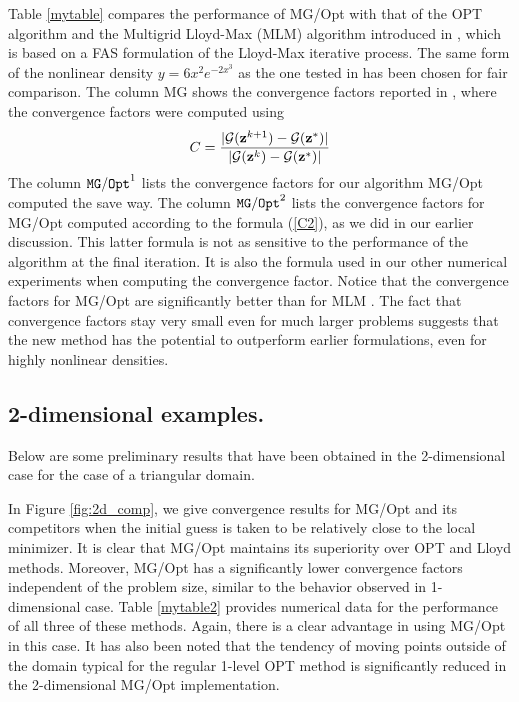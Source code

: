 \documentclass{siamltex}
\newcommand{\ds}{\displaystyle}
\begin{document}
Table  \ref{mytable} compares the performance of MG/Opt with that of the OPT algorithm and the Multigrid Lloyd-Max (MLM) algorithm  introduced in \cite{yavneh03}, which is based on a FAS formulation of the Lloyd-Max iterative process. The same form of the nonlinear density $y=6x^{2}e^{-2x^{3}}$ as the one tested in \cite{yavneh03} has been chosen for fair comparison.  The column MG\cite{yavneh03} shows the convergence factors reported in \cite{yavneh03}, where the convergence factors were computed using
\begin{equation}
\ds C=\frac{|\cg(\bz^{k+1})-\cg(\bz^{*})| }{|\cg(\bz^{k})-\cg(\bz^{*})| }
\label{C1}
\end{equation}
The column ${\tt MG/Opt}^{1}$ lists the convergence factors for our algorithm MG/Opt computed the save way. The column ${\tt MG/Opt}^{2}$ lists the convergence factors for MG/Opt computed according to the formula (\ref{C2}), as we did in our earlier discussion. This latter formula is not as sensitive to the performance of the algorithm at the final iteration. It is also the formula used in our other numerical experiments when computing the convergence factor. Notice that the convergence factors for MG/Opt are significantly better than for MLM \cite{yavneh03}. The fact that convergence factors stay very small even for much larger problems  suggests that the new method has the potential to outperform earlier formulations, %
even for highly nonlinear densities.

\subsection{2-dimensional examples.}
Below are some preliminary results that have been obtained in the 2-dimensional %
case for the case of a triangular domain. %

In Figure \ref{fig:2d_comp}, we give convergence results for MG/Opt and its competitors when the %
initial guess is taken to be relatively close to the local minimizer. It is clear that MG/Opt maintains its superiority over OPT and Lloyd methods. Moreover, MG/Opt has a significantly lower convergence factors independent of the problem size, similar to the behavior observed in 1-dimensional case. Table %
\ref{mytable2} provides numerical data for the performance of all three of these methods. Again, there is a clear advantage in using MG/Opt in this case. It has also been noted that the tendency of moving points outside of the domain typical for the regular 1-level OPT method is significantly reduced in the 2-dimensional MG/Opt implementation.
\end{document}
